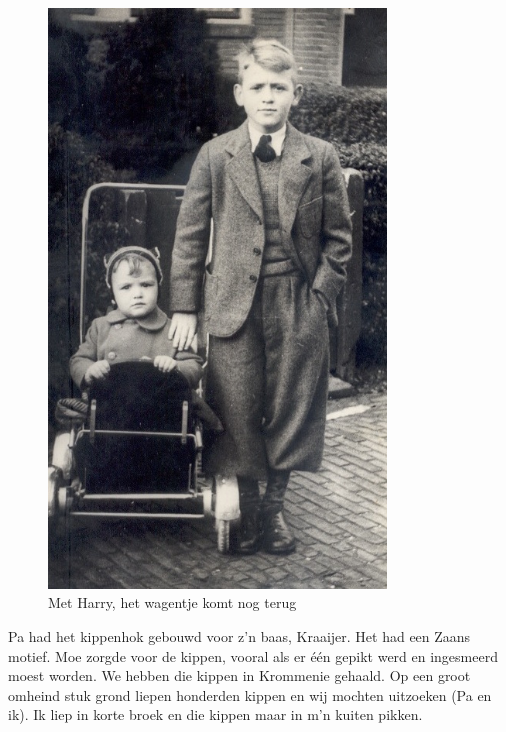 \documentclass[12pt,twoside, openright]{memoir}
\begin{document}
\begin{figure}
\centering
\includegraphics[width=0.8\textwidth]{img/ch5/RuudHarry2}
\caption*{\footnotesize Met Harry, het wagentje komt nog terug}
\end{figure}

Pa had het kippenhok gebouwd voor z’n baas, Kraaijer. Het had een Zaans motief. Moe zorgde voor de kippen, vooral als er één gepikt werd en ingesmeerd moest worden. We hebben die kippen in Krommenie gehaald. Op een groot omheind stuk grond liepen honderden kippen en wij mochten uitzoeken (Pa en ik). Ik liep in korte broek en die kippen maar in m’n kuiten pikken. 
\end{document}
